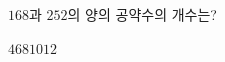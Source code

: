\hspace*{2mm}\begin{minipage}[t]{\dimexpr\linewidth-2mm\relax}\vspace{0pt}
$168$과 $252$의 양의 공약수의 개수는?
\begin{choices32}{$4$}{$6$}{$8$}{$10$}{$12$}\end{choices32}\end{minipage}
